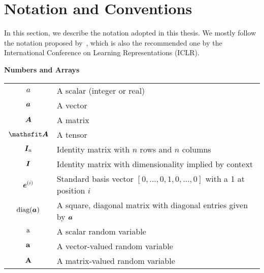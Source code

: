 \chapter*{Notation and Conventions}
\label{notation}

\newlength{\notationgap}
\setlength{\notationgap}{1pc}

In this section, we describe the notation adopted in this thesis. We mostly follow the notation proposed by~\citet{Goodfellow2016}, which is also the recommended one by the International Conference on Learning Representations (ICLR).

\vspace{\notationgap}
\begin{minipage}{\textwidth}
	\centerline{\bf Numbers and Arrays}
	\bgroup
	\def\arraystretch{1.5}
	\begin{tabular}{cp{3.25in}}
		$\displaystyle a$ & A scalar (integer or real)\\
		$\displaystyle {\bm{a}}$ & A vector\\
		$\displaystyle {\bm{A}}$ & A matrix\\
		$\displaystyle \tA$ & A tensor\\
		$\displaystyle {\bm{I}}_n$ & Identity matrix with $n$ rows and $n$ columns\\
		$\displaystyle {\bm{I}}$ & Identity matrix with dimensionality implied by context\\
		$\displaystyle {\bm{e}}^{(i)}$ & Standard basis vector $[0,\dots,0,1,0,\dots,0]$ with a 1 at position $i$\\
		$\displaystyle \text{diag}({\bm{a}})$ & A square, diagonal matrix with diagonal entries given by ${\bm{a}}$\\
		$\displaystyle {\textnormal{a}}$ & A scalar random variable\\
		$\displaystyle {\mathbf{a}}$ & A vector-valued random variable\\
		$\displaystyle {\mathbf{A}}$ & A matrix-valued random variable\\
	\end{tabular}
	\egroup
\end{minipage}


